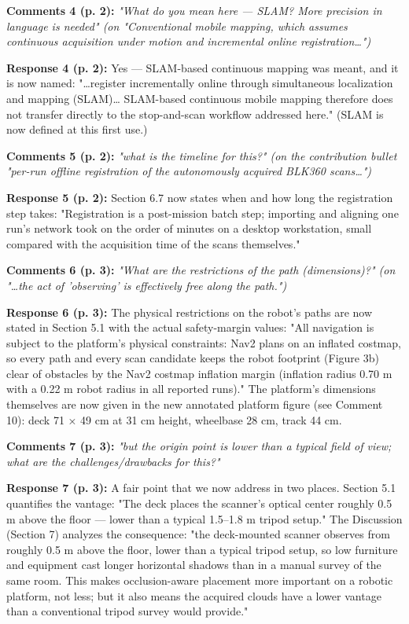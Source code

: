 \documentclass[11pt]{article}
\begin{document}
\medskip

\textbf{Comments 4 (p. 2):} \emph{"What do you mean here — SLAM? More precision in language is needed" \emph{(on "Conventional mobile mapping, which assumes continuous acquisition under motion and incremental online registration…")}}

\textbf{Response 4 (p. 2):} Yes — SLAM-based continuous mapping was meant, and it is now named: "…register incrementally online through simultaneous localization and mapping (SLAM)… SLAM-based continuous mobile mapping therefore does not transfer directly to the stop-and-scan workflow addressed here." (SLAM is now defined at this first use.)

\medskip

\textbf{Comments 5 (p. 2):} \emph{"what is the timeline for this?" \emph{(on the contribution bullet "per-run offline registration of the autonomously acquired BLK360 scans…")}}

\textbf{Response 5 (p. 2):} Section 6.7 now states when and how long the registration step takes: "Registration is a post-mission batch step; importing and aligning one run's network took on the order of minutes on a desktop workstation, small compared with the acquisition time of the scans themselves."

\medskip

\textbf{Comments 6 (p. 3):} \emph{"What are the restrictions of the path (dimensions)?" \emph{(on "…the act of 'observing' is effectively free along the path.")}}

\textbf{Response 6 (p. 3):} The physical restrictions on the robot's paths are now stated in Section 5.1 with the actual safety-margin values: "All navigation is subject to the platform's physical constraints: Nav2 plans on an inflated costmap, so every path and every scan candidate keeps the robot footprint (Figure 3b) clear of obstacles by the Nav2 costmap inflation margin (inflation radius 0.70 m with a 0.22 m robot radius in all reported runs)." The platform's dimensions themselves are now given in the new annotated platform figure (see Comment 10): deck 71 × 49 cm at 31 cm height, wheelbase 28 cm, track 44 cm.

\medskip

\textbf{Comments 7 (p. 3):} \emph{"but the origin point is lower than a typical field of view; what are the challenges/drawbacks for this?"}

\textbf{Response 7 (p. 3):} A fair point that we now address in two places. Section 5.1 quantifies the vantage: "The deck places the scanner's optical center roughly 0.5 m above the floor — lower than a typical 1.5–1.8 m tripod setup." The Discussion (Section 7) analyzes the consequence: "the deck-mounted scanner observes from roughly 0.5 m above the floor, lower than a typical tripod setup, so low furniture and equipment cast longer horizontal shadows than in a manual survey of the same room. This makes occlusion-aware placement more important on a robotic platform, not less; but it also means the acquired clouds have a lower vantage than a conventional tripod survey would provide."
\end{document}

